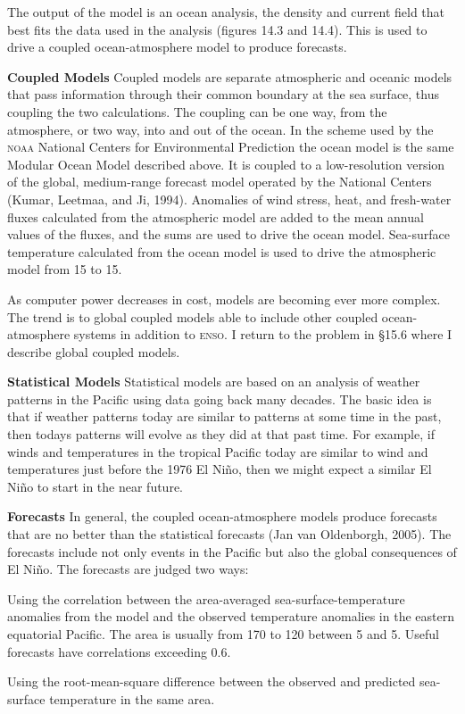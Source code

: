 The output of the model is an ocean analysis, the density and current
field that best fits the data used in the analysis (figures 14.3 and
14.4). This is used to drive a coupled ocean-atmosphere model to
produce forecasts.

\textbf{Coupled Models} Coupled models are separate atmospheric and oceanic models that pass information
through their common boundary at the sea surface, thus coupling the
two calculations. The coupling can be one way, from the atmosphere, or
two way, into and out of the ocean. In the scheme used by the
\textsc{noaa} National Centers for Environmental Prediction the ocean
model is the same Modular Ocean Model described above. It is coupled
to a low-resolution version of the global, medium-range forecast model
operated by the National Centers (Kumar, Leetmaa, and Ji,
1994). Anomalies of wind
stress, heat, and fresh-water fluxes
calculated from the atmospheric model are added to the mean annual
values of the fluxes, and the sums are used to drive the ocean
model. Sea-surface temperature calculated from the ocean model is used
to drive the atmospheric model from 15 to 15.

As computer power decreases in cost, models are becoming ever more
complex. The trend is to global coupled models able to include other
coupled ocean-atmosphere systems in addition to
\textsc{enso}. I return to the problem in \S 15.6 where I
describe global coupled models.

\textbf{Statistical Models} Statistical models are based on an
analysis of weather patterns in the Pacific using data going back many
decades. The basic idea is that if weather patterns today are similar
to patterns at some time in the past, then todays patterns will evolve
as they did at that past time. For example, if winds and temperatures
in the tropical Pacific today are similar to wind and temperatures
just before the 1976 El Ni\~{n}o, then we might expect a similar El
Ni\~{n}o to start in the near future.

\textbf{Forecasts} In general, the coupled ocean-atmosphere models
produce forecasts that are no better than the
statistical forecasts (Jan van Oldenborgh, 2005). The forecasts
include not only events in the Pacific but also the global
consequences of El Ni\~{n}o. The forecasts are judged two ways:
\begin{enumerate}
\vitem Using the correlation between the area-averaged
sea-surface-temperature anomalies from the model and the observed temperature anomalies
in the eastern equatorial Pacific. The area is usually from
170 to 120 between 5 and
5. Useful forecasts have correlations exceeding 0.6.

\vitem Using the root-mean-square difference between the observed and
predicted sea-surface temperature in the same area.
\end{enumerate}

